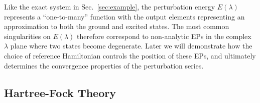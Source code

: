 \documentclass[aps,prb,reprint,noshowkeys,linenumbers,superscriptaddress]{revtex4-1}
\begin{document}
Like the exact system in Sec.~\ref{sec:example}, the perturbation energy $E(\lambda)$ represents
a ``one-to-many'' function with the output elements representing an approximation to both the ground and excited states.
The most common singularities on $E(\lambda)$ therefore correspond to non-analytic EPs in the complex 
$\lambda$ plane where two states become degenerate.
Later we will demonstrate how the choice of reference Hamiltonian controls the position of these EPs, and 
ultimately determines the convergence properties of the perturbation series.

\subsection{Hartree-Fock Theory}
\label{sec:HF}
\end{document}

